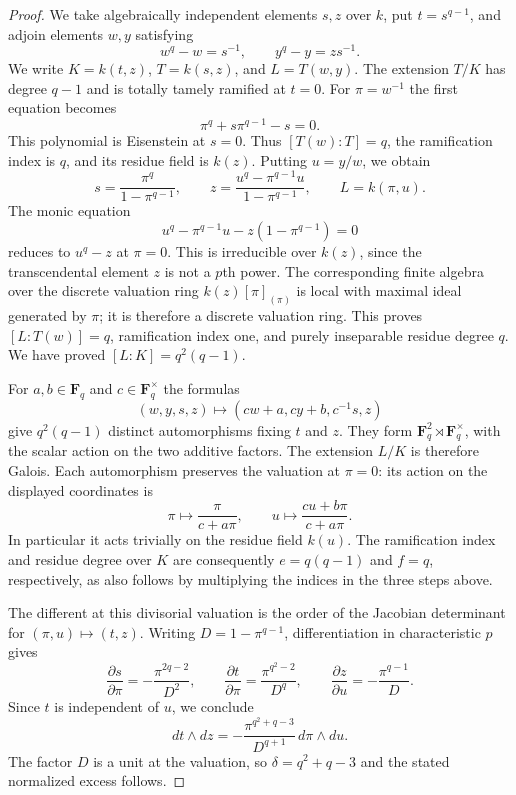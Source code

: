\begin{proof}
We take algebraically independent elements $s,z$ over $k$, put
$t=s^{q-1}$, and adjoin elements $w,y$ satisfying
\[
 w^q-w=s^{-1},\qquad y^q-y=zs^{-1}.
\]
We write $K=k(t,z)$, $T=k(s,z)$, and $L=T(w,y)$.
The extension $T/K$ has degree $q-1$ and is totally tamely ramified
at $t=0$.  For $\pi=w^{-1}$ the first equation becomes
\[
 \pi^q+s\pi^{q-1}-s=0.
\]
This polynomial is Eisenstein at $s=0$.  Thus $[T(w):T]=q$, the
ramification index is $q$, and its residue field is $k(z)$.
Putting $u=y/w$, we obtain
\begin{equation}
\label{D:fierce-small-excess-coordinates}
 s=\frac{\pi^q}{1-\pi^{q-1}},\qquad
 z=\frac{u^q-\pi^{q-1}u}{1-\pi^{q-1}},\qquad
 L=k(\pi,u).
\end{equation}
The monic equation
\[
 u^q-\pi^{q-1}u-z(1-\pi^{q-1})=0
\]
reduces to $u^q-z$ at $\pi=0$.  This is irreducible over $k(z)$,
since the transcendental element $z$ is not a $p$th power.
The corresponding finite algebra over the discrete valuation ring
$k(z)[\pi]_{(\pi)}$ is local with maximal ideal generated by $\pi$;
it is therefore a discrete valuation ring.  This proves
$[L:T(w)]=q$, ramification index one, and purely inseparable residue
degree $q$.  We have proved $[L:K]=q^2(q-1)$.

For $a,b\in\mathbf F_q$ and $c\in\mathbf F_q^\times$ the formulas
\[
 (w,y,s,z)\longmapsto(cw+a,cy+b,c^{-1}s,z)
\]
give $q^2(q-1)$ distinct automorphisms fixing $t$ and $z$.
They form $\mathbf F_q^2\rtimes\mathbf F_q^\times$, with the
scalar action on the two additive factors.  The extension $L/K$ is
therefore Galois.  Each automorphism preserves the valuation at $\pi=0$:
its action on the displayed coordinates is
\[
 \pi\longmapsto\frac{\pi}{c+a\pi},\qquad
 u\longmapsto\frac{cu+b\pi}{c+a\pi}.
\]
In particular it acts trivially on the residue field $k(u)$.
The ramification index and residue degree over $K$ are consequently
$e=q(q-1)$ and $f=q$, respectively, as also follows by multiplying
the indices in the three steps above.

The different at this divisorial valuation is the order of the
Jacobian determinant for $(\pi,u)\mapsto(t,z)$.
Writing $D=1-\pi^{q-1}$, differentiation in characteristic $p$ gives
\[
 \frac{\partial s}{\partial\pi}
       =-\frac{\pi^{2q-2}}{D^2},\qquad
 \frac{\partial t}{\partial\pi}
       =\frac{\pi^{q^2-2}}{D^q},\qquad
 \frac{\partial z}{\partial u}
       =-\frac{\pi^{q-1}}D.
\]
Since $t$ is independent of $u$, we conclude
\[
 dt\wedge dz
   =-\frac{\pi^{q^2+q-3}}{D^{q+1}}\,d\pi\wedge du.
\]
The factor $D$ is a unit at the valuation, so
$\delta=q^2+q-3$ and the stated normalized excess follows.
\end{proof}

